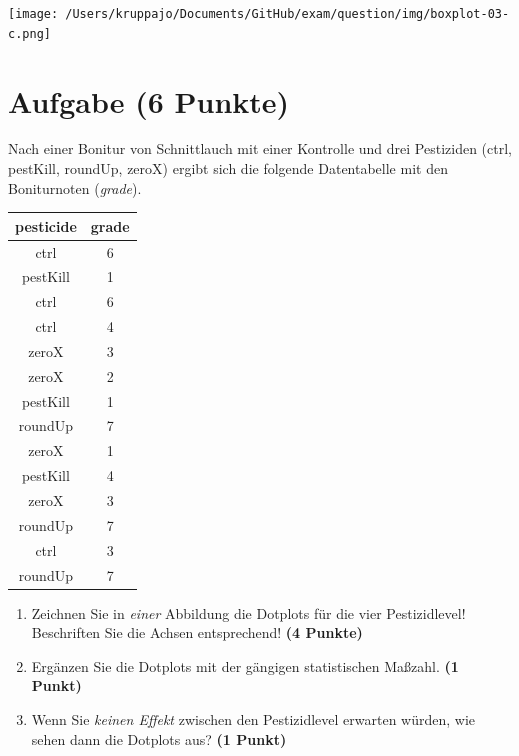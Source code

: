 \documentclass[a4paper, 10pt]{scrartcl}\usepackage[]{graphicx}\usepackage[]{xcolor}
\begin{document}
\vspace*{8cm}

\begin{center}
  \texttt{[image: /Users/kruppajo/Documents/GitHub/exam/question/img/boxplot-03-c.png]}
\end{center}



 
\clearpage

\section{Aufgabe \hfill (6 Punkte)}

Nach einer Bonitur von Schnittlauch mit einer Kontrolle und drei Pestiziden (ctrl, pestKill, roundUp, zeroX) ergibt sich die folgende Datentabelle mit den Boniturnoten (\textit{grade}). 

\begin{table}[!h]
\centering
\begin{tabular}{cc}
\toprule
pesticide & grade\\
\midrule
ctrl & 6\\
pestKill & 1\\
ctrl & 6\\
ctrl & 4\\
zeroX & 3\\
\addlinespace
zeroX & 2\\
pestKill & 1\\
roundUp & 7\\
zeroX & 1\\
pestKill & 4\\
\addlinespace
zeroX & 3\\
roundUp & 7\\
ctrl & 3\\
roundUp & 7\\
\bottomrule
\end{tabular}
\end{table}



\begin{enumerate}
\item Zeichnen Sie in \textit{einer} Abbildung die Dotplots f{\"u}r die
  vier Pestizidlevel! Beschriften Sie die Achsen entsprechend!
  \textbf{(4 Punkte)}
\item Erg{\"a}nzen Sie die Dotplots mit der g{\"a}ngigen
  statistischen Ma{\ss}zahl. \textbf{(1 Punkt)}
\item Wenn Sie \textit{keinen Effekt} zwischen den Pestizidlevel erwarten
  w{\"u}rden, wie sehen dann die Dotplots aus? \textbf{(1 Punkt)}
\end{enumerate} 
\clearpage
\end{document}
